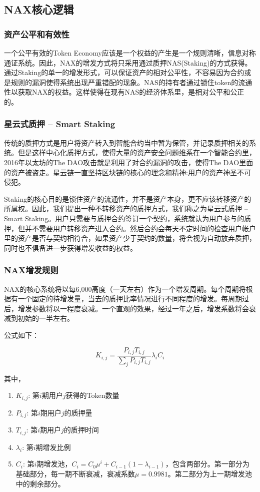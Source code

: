 \subsection{NAX核心逻辑}

\subsubsection{资产公平和有效性}

一个公平有效的Token Economy应该是一个权益的产生是一个规则清晰，信息对称通证系统。因此，NAX的增发方式将只采用通过质押NAS(Staking)的方式获得。通过Staking的单一的增发形式，可以保证资产的相对公平性，不容易因为合约或是规则的漏洞使得系统出现严重错配的现象。NAS的持有者通过锁住token的流通性以获取NAX的权益。这样使得在现有NAS的经济体系里，是相对公平和公正的。

\subsubsection{星云式质押 -- Smart Staking}
传统的质押方式是用户将资产转入到智能合约当中暂为保管，并记录质押相关的系统。但是这样中心化质押方式，使得大量的资产安全问题维系在一个智能合约里，2016年以太坊的The DAO攻击就是利用了对合约漏洞的攻击，使得The DAO里面的资产被盗走。星云链一直坚持区块链的核心的理念和精神:用户的资产神圣不可侵犯。

Staking的核心目的是锁住资产的流通性，并不是资产本身，更不应该转移资产的所属权。因此，我们提出一种不转移资产的质押方式，我们称之为星云式质押 -- Smart Staking。用户只需要与质押合约签订一个契约，系统就认为用户参与的质押，但并不需要用户转移资产进入合约。然后合约会每天不定时间的检查用户帐户里的资产是否与契约相符合，如果资产少于契约的数量，将会视为自动放弃质押，同时也不俱备进一步获得增发收益的权益。

\subsubsection{NAX增发规则}
NAX的核心系统将以每6,000高度（一天左右）作为一个增发周期。每个周期将根据有一个固定的待增发量，当去的质押比率情况进行不同程度的增发。每周期过后，增发参数将以一程度衰减。一个直观的效果，经过一年之后，增发系数将会衰减到初始的一半左右。

公式如下：

\begin{equation}
  K_{i,j} = \frac{P_{i,j} T_{i,j}}{\sum_j P_{i,j} T_{i,j}} \lambda_i C_i
\end{equation}

其中，
\begin{enumerate}
   \item \(K_{i,j}\): 第\(i\)期用户\(j\)获得的Token数量
   \item \(P_{i,j}\): 第\(i\)期用户\(j\)的质押量
   \item \(T_{i,j}\): 第\(i\)期用户\(j\)的质押时间
   \item \(\lambda_i\): 第\(i\)期增发比例
   \item \(C_i\): 第\(i\)期增发池，\(C_i = C_0 \mu^i + C_{i-1} (1-\lambda_{i-1})\)，包含两部分。第一部分为基础部分，每一期不断衰减，衰减系数$\mu=0.9981$。第二部分为上一期增发池中的剩余部分。
\end{enumerate}

